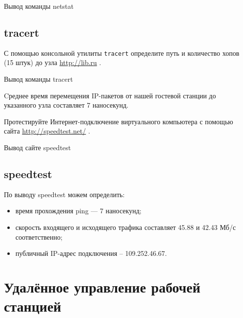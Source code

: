 \begin{image}
	\caption{Вывод команды netstat}
	\label{fig:netstat}
\end{image}

\subsection{tracert}

С помощью консольной утилиты \texttt{tracert} определите путь
и количество хопов (15 штук) до узла \url{http://lib.ru}
.

\begin{image}
	\caption{Вывод команды tracert}
	\label{fig:tracert}
\end{image}

Cреднее время перемещения IP-пакетов от нашей гостевой станции
до указанного узла составляет 7 наносекунд.


Протестируйте Интернет-подключение виртуального компьютера с помощью сайта
\url{http://speedtest.net/} .

\begin{image}
	\caption{Вывод сайте speedtest}
	\label{fig:speedtest}
\end{image}

\subsection{speedtest}

По выводу speedtest можем определить:

\begin{itemize}
	\item время прохождения ping --- 7 наносекунд;
	\item скорость входящего и исходящего трафика
		составляет 45.88 и 42.43 Мб/с соответственно;
	\item публичный IP-адрес подключения -- 109.252.46.67.
\end{itemize}




\section{Удалённое управление рабочей станцией}



